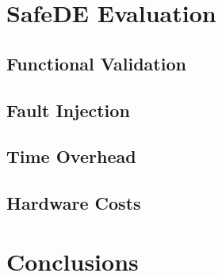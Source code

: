 
\section{SafeDE Evaluation}
\subsection{Functional Validation}
\subsection{Fault Injection}
\subsection{Time Overhead}
\subsection{Hardware Costs}



\section{Conclusions}

